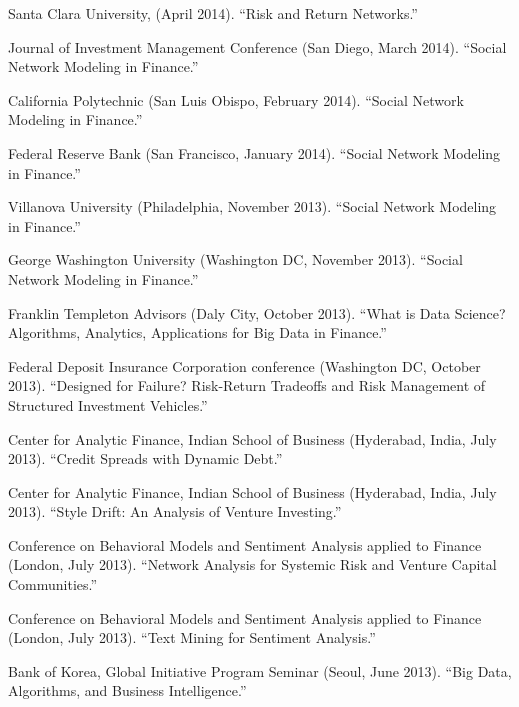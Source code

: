 \documentclass{article}
\begin{document}
\begin{etaremune}
{\item Santa Clara University, (April 2014). ``Risk and Return Networks.'' 

\item Journal of Investment Management Conference (San Diego, March 2014). ``Social Network Modeling in Finance.'' 

\item California Polytechnic (San Luis Obispo, February 2014). ``Social Network Modeling in Finance.'' 

\item Federal Reserve Bank (San Francisco, January 2014). ``Social Network Modeling in Finance.'' 

\item Villanova University (Philadelphia, November 2013). ``Social Network Modeling in Finance.'' 

\item George Washington University (Washington DC, November 2013). ``Social Network Modeling in Finance.'' 

\item Franklin Templeton Advisors (Daly City, October 2013). ``What is Data Science? Algorithms, Analytics, Applications for Big Data in Finance.'' 

\item Federal Deposit Insurance Corporation conference (Washington DC, October 2013). ``Designed for Failure? Risk-Return Tradeoffs and Risk Management of Structured Investment Vehicles.''

\item Center for Analytic Finance, Indian School of Business (Hyderabad, India, July 2013). ``Credit Spreads with Dynamic Debt.''

\item Center for Analytic Finance, Indian School of Business (Hyderabad, India, July 2013). ``Style Drift: An Analysis of Venture Investing.''

\item Conference on Behavioral Models and Sentiment Analysis applied to Finance (London, July 2013). ``Network Analysis for Systemic Risk and Venture Capital Communities.'' 

\item Conference on Behavioral Models and Sentiment Analysis applied to Finance (London, July 2013). ``Text Mining for Sentiment Analysis.'' 

\item Bank of Korea, Global Initiative Program Seminar (Seoul, June 2013). ``Big Data, Algorithms, and Business Intelligence.''

}
\end{etaremune}
\end{document}
